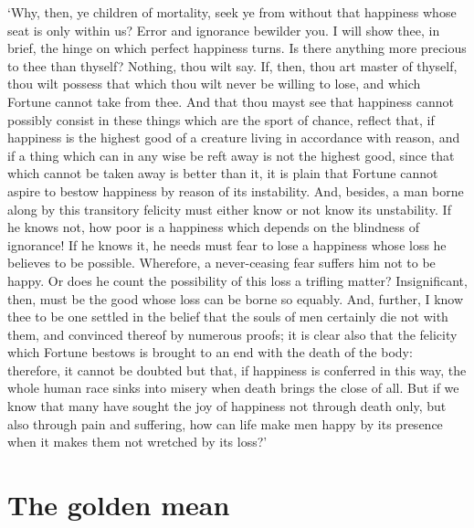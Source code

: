\documentclass[11pt]{book}
\begin{document}
`Why, then, ye children of mortality, seek ye from without that
happiness whose seat is only within us? Error and ignorance bewilder
you. I will show thee, in brief, the hinge on which perfect happiness
turns. Is there anything more precious to thee than thyself? Nothing,
thou wilt say. If, then, thou art master of thyself, thou wilt possess
that which thou wilt never be willing to lose, and which Fortune cannot
take from thee. And that thou mayst see that happiness cannot possibly
consist in these things which are the sport of chance, reflect that, if
happiness is the highest good of a creature living in accordance with
reason, and if a thing which can in any wise be reft away is not the
highest good, since that which cannot be taken away is better than it,
it is plain that Fortune cannot aspire to bestow happiness by reason of
its instability. And, besides, a man borne along by this transitory
felicity must either know or not know its unstability. If he knows not,
how poor is a happiness which depends on the blindness of ignorance! If
he knows it, he needs must fear to lose a happiness whose loss he
believes to be possible. Wherefore, a never-ceasing fear suffers him not
to be happy. Or does he count the possibility of this loss a trifling
matter? Insignificant, then, must be the good whose loss can be borne so
equably. And, further, I know thee to be one settled in the belief that
the souls of men certainly die not with them, and convinced thereof by
numerous proofs; it is clear also that the felicity which Fortune
bestows is brought to an end with the death of the body: therefore, it
cannot be doubted but that, if happiness is conferred in this way, the
whole human race sinks into misery when death brings the close of all.
But if we know that many have sought the joy of happiness not through
death only, but also through pain and suffering, how can life make men
happy by its presence when it makes them not wretched by its loss?'




\section{The golden mean}
\end{document}
